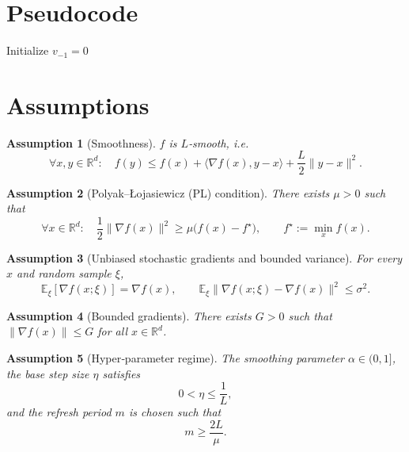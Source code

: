 \documentclass{article}
\newtheorem{assumption}{Assumption}[section]
\begin{document}
\section*{Pseudocode}
\begin{algorithm}[H]
\caption{Adaptive Variance‑Reduced Gradient (AVRG)}
\SetAlgoLined
\KwIn{Initial point $x_0$, base step size $\eta>0$, smoothing $\alpha\in(0,1]$, refresh period $m\in\mathbb{N}$, total iterations $T$.}
Initialize $v_{-1}=0$ \;
\end{algorithm}

\section*{Assumptions}
\begin{assumption}[Smoothness]\label{ass:smooth}
$f$ is $L$‑smooth, i.e.
\[
\forall x,y\in\mathbb{R}^d:\quad
f(y)\le f(x)+\langle\nabla f(x),y-x\rangle+\frac{L}{2}\|y-x\|^2 .
\]
\end{assumption}
\begin{assumption}[Polyak–Łojasiewicz (PL) condition]\label{ass:pl}
There exists $\mu>0$ such that
\[
\forall x\in\mathbb{R}^d:\quad
\frac{1}{2}\|\nabla f(x)\|^2\ge\mu\bigl(f(x)-f^\star\bigr),
\qquad f^\star:=\min_x f(x).
\]
\end{assumption}
\begin{assumption}[Unbiased stochastic gradients and bounded variance]\label{ass:stoch}
For every $x$ and random sample $\xi$,
\[
\mathbb{E}_\xi[\nabla f(x;\xi)]=\nabla f(x),\qquad
\mathbb{E}_\xi\bigl\|\nabla f(x;\xi)-\nabla f(x)\bigr\|^2\le\sigma^2 .
\]
\end{assumption}
\begin{assumption}[Bounded gradients]\label{ass:bounded}
There exists $G>0$ such that $\|\nabla f(x)\|\le G$ for all $x\in\mathbb{R}^d$.
\end{assumption}
\begin{assumption}[Hyper‑parameter regime]\label{ass:params}
The smoothing parameter $\alpha\in(0,1]$, the base step size $\eta$ satisfies
\[
0<\eta\le\frac{1}{L},
\]
and the refresh period $m$ is chosen such that
\[
m\ge \frac{2L}{\mu}.
\]
\end{assumption}
\end{document}
